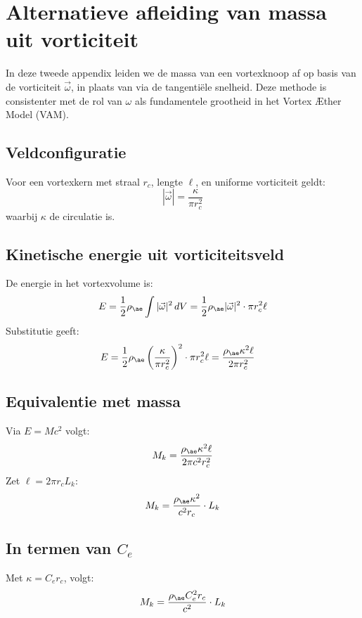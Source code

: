 \section{Alternatieve afleiding van massa uit vorticiteit}

In deze tweede appendix leiden we de massa van een vortexknoop af op basis van de vorticiteit \( \vec{\omega} \), in plaats van via de tangentiële snelheid. Deze methode is consistenter met de rol van \( \omega \) als fundamentele grootheid in het Vortex \AE ther Model (VAM).

\subsection{Veldconfiguratie}
Voor een vortexkern met straal \( r_c \), lengte \( \ell \), en uniforme vorticiteit geldt:
\begin{equation}
    |\vec{\omega}| = \frac{\kappa}{\pi r_c^2}
\end{equation}
waarbij \( \kappa \) de circulatie is.

\subsection{Kinetische energie uit vorticiteitsveld}
De energie in het vortexvolume is:
\begin{equation}
    E = \frac{1}{2} \rho_{\ae} \int |\vec{\omega}|^2 \, dV = \frac{1}{2} \rho_{\ae} |\vec{\omega}|^2 \cdot \pi r_c^2 \ell
\end{equation}
Substitutie geeft:
\begin{align}
    E &= \frac{1}{2} \rho_{\ae} \left( \frac{\kappa}{\pi r_c^2} \right)^2 \cdot \pi r_c^2 \ell = \frac{\rho_{\ae} \kappa^2 \ell}{2 \pi r_c^2}
\end{align}

\subsection{Equivalentie met massa}
Via \( E = M c^2 \) volgt:
\begin{equation}
    M_k = \frac{\rho_{\ae} \kappa^2 \ell}{2 \pi c^2 r_c^2}
\end{equation}
Zet \( \ell = 2 \pi r_c L_k \):
\begin{equation}
    M_k = \frac{\rho_{\ae} \kappa^2}{c^2 r_c} \cdot L_k
\end{equation}

\subsection{In termen van \( C_e \)}
Met \( \kappa = C_e r_c \), volgt:
\begin{equation}
    M_k = \frac{\rho_{\ae} C_e^2 r_c}{c^2} \cdot L_k
\end{equation}

